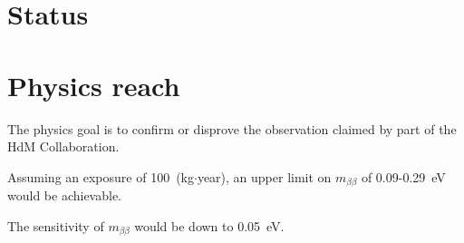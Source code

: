 \section{Status}
\label{sec:gerda:stat}

\section{Physics reach}
\label{sec:gerda:sens}

The physics goal is to
confirm or disprove the observation claimed by part of the HdM
Collaboration. 

Assuming an exposure of
100~(kg$\cdot$year), an upper limit on $m_{\beta\beta}$ of
0.09-0.29~eV would be achievable. 

 The sensitivity of $m_{\beta\beta}$ would be down to
0.05~eV.

